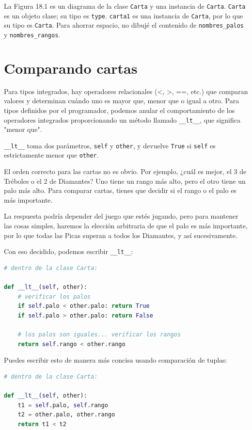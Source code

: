 La Figura 18.1 es un diagrama de la clase \texttt{Carta} y una instancia de \texttt{Carta}. \texttt{Carta} es un objeto clase; su tipo es \texttt{type}. \texttt{carta1} es una instancia de \texttt{Carta}, por lo que su tipo es \texttt{Carta}. Para ahorrar espacio, no dibujé el contenido de \texttt{nombres\_palos} y \texttt{nombres\_rangos}.

\section{Comparando cartas}

Para tipos integrados, hay operadores relacionales (<, >, ==, etc.) que comparan valores y determinan cuándo uno es mayor que, menor que o igual a otro. Para tipos definidos por el programador, podemos anular el comportamiento de los operadores integrados proporcionando un método llamado \texttt{\_\_lt\_\_}, que significa "menor que".

\texttt{\_\_lt\_\_} toma dos parámetros, \texttt{self} y \texttt{other}, y devuelve \texttt{True} si \texttt{self} es estrictamente menor que \texttt{other}.

El orden correcto para las cartas no es obvio. Por ejemplo, ¿cuál es mejor, el 3 de Tréboles o el 2 de Diamantes? Uno tiene un rango más alto, pero el otro tiene un palo más alto. Para comparar cartas, tienes que decidir si el rango o el palo es más importante.

La respuesta podría depender del juego que estés jugando, pero para mantener las cosas simples, haremos la elección arbitraria de que el palo es más importante, por lo que todas las Picas superan a todos los Diamantes, y así sucesivamente.

Con eso decidido, podemos escribir \texttt{\_\_lt\_\_}:

\begin{lstlisting}[language=Python]
# dentro de la clase Carta:

def __lt__(self, other):
    # verificar los palos
    if self.palo < other.palo: return True
    if self.palo > other.palo: return False

    # los palos son iguales... verificar los rangos
    return self.rango < other.rango
\end{lstlisting}

Puedes escribir esto de manera más concisa usando comparación de tuplas:

\begin{lstlisting}[language=Python]
# dentro de la clase Carta:

def __lt__(self, other):
    t1 = self.palo, self.rango
    t2 = other.palo, other.rango
    return t1 < t2
\end{lstlisting}

